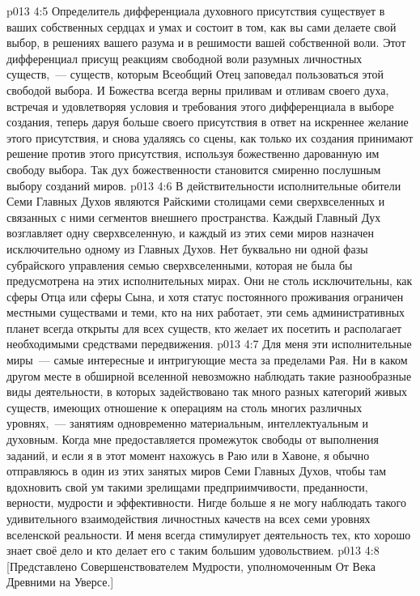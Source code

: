 \vs p013 4:5 Определитель дифференциала духовного присутствия существует в ваших собственных сердцах и умах и состоит в том, как вы сами делаете свой выбор, в решениях вашего разума и в решимости вашей собственной воли. Этот дифференциал присущ реакциям свободной воли разумных личностных существ,~--- существ, которым Всеобщий Отец заповедал пользоваться этой свободой выбора. И Божества всегда верны приливам и отливам своего духа, встречая и удовлетворяя условия и требования этого дифференциала в выборе создания, теперь даруя больше своего присутствия в ответ на искреннее желание этого присутствия, и снова удаляясь со сцены, как только их создания принимают решение против этого присутствия, используя божественно дарованную им свободу выбора. Так дух божественности становится смиренно послушным выбору созданий миров.
\vs p013 4:6 \pc В действительности исполнительные обители Семи Главных Духов являются Райскими столицами семи сверхвселенных и связанных с ними сегментов внешнего пространства. Каждый Главный Дух возглавляет одну сверхвселенную, и каждый из этих семи миров назначен исключительно одному из Главных Духов. Нет буквально ни одной фазы субрайского управления семью сверхвселенными, которая не была бы предусмотрена на этих исполнительных мирах. Они не столь исключительны, как сферы Отца или сферы Сына, и хотя статус постоянного проживания ограничен местными существами и теми, кто на них работает, эти семь административных планет всегда открыты для всех существ, кто желает их посетить и располагает необходимыми средствами передвижения.
\vs p013 4:7 Для меня эти исполнительные миры~--- самые интересные и интригующие места за пределами Рая. Ни в каком другом месте в обширной вселенной невозможно наблюдать такие разнообразные виды деятельности, в которых задействовано так много разных категорий живых существ, имеющих отношение к операциям на столь многих различных уровнях,~--- занятиям одновременно материальным, интеллектуальным и духовным. Когда мне предоставляется промежуток свободы от выполнения заданий, и если я в этот момент нахожусь в Раю или в Хавоне, я обычно отправляюсь в один из этих занятых миров Семи Главных Духов, чтобы там вдохновить свой ум такими зрелищами предприимчивости, преданности, верности, мудрости и эффективности. Нигде больше я не могу наблюдать такого удивительного взаимодействия личностных качеств на всех семи уровнях вселенской реальности. И меня всегда стимулирует деятельность тех, кто хорошо знает своё дело и кто делает его с таким большим удовольствием.
\vsetoff
\vs p013 4:8 [Представлено Совершенствователем Мудрости, уполномоченным От Века Древними на Уверсе.]
\quizlink
